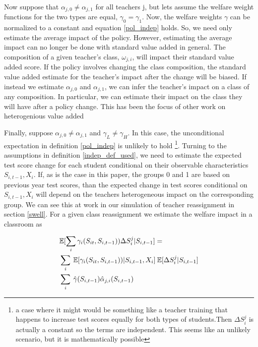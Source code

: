 \documentclass[12pt]{article}
\theoremstyle{definition}
\theoremstyle{definition}
\theoremstyle{definition}
\theoremstyle{definition}
\begin{document}
    Now suppose that $\alpha_{j,0} \neq \alpha_{j,1}$ for all teachers j, but lets assume the welfare weight functions for the two types are equal, $\gamma_0 = \gamma_1$. Now, the welfare weights $\gamma$ can be normalized to a constant and equation \ref{pol_indep} holds. So, we need only estimate the average impact of the policy. However, estimating the average impact can no longer be done with standard value added in general. The composition of a given teacher's class, $\omega_{j,i}$, will impact their standard value added score. If the policy involves changing the class composition, the standard value added estimate for the teacher's impact after the change will be biased. If instead we estimate $\alpha_{j,0}$ and $\alpha_{j,1}$, we can infer the teacher's impact on a class of any composition. In particular, we can estimate their impact on the class they will have after a policy change. This has been the focus of other work on heterogenious value added \citep{ahn2021importance, Delgado2020}
    
    Finally, suppose $\alpha_{j,0} \neq \alpha_{j,1}$ and $\gamma_L \neq \gamma_H$. In this case, the unconditional expectation in definition \ref{pol_indep} is unlikely to hold \footnote{a case where it might would be something like a teacher training that happens to increase test scores equally for both types of students.Then $\Delta S_i^j$ is actually a constant so the terms are independent. This seems like an unlikely scenario, but it is mathematically possible}. Turning to the assumptions in definition \ref{indep_def_used}, we need to estimate the expected test score change for each student conditional on their observable characteristics $S_{i,t-1}, X_i$. If, as is the case in this paper, the groups 0 and 1 are based on previous year test scores, than the expected change in test scores conditional on $S_{i,t-1}, X_i$ will depend on the teachers heterogeneous impact on the corresponding group. We can see this at work in our simulation of teacher reassignment in section \ref{swell}. For a given class reassignment we estimate the welfare impact in a classroom as 

        \begin{align}
           & \mathbb{E}[\sum_i \gamma_i(S_{it}, S_{i,t-1})) \Delta S_i^j| S_{i,t-1}] = \\ 
           & \sum_i \: \mathbb{E}[\gamma_i(S_{it}, S_{i,t-1}))|S_{i,t-1}, X_i] \:\mathbb{E}[\Delta S_i^j|S_{i,t-1}] \\
           & \sum_i \: \hat{\gamma}(S_{i,t-1}) \hat{\alpha}_{j,i}(S_{i,t-1})
        \end{align}
\end{document}
